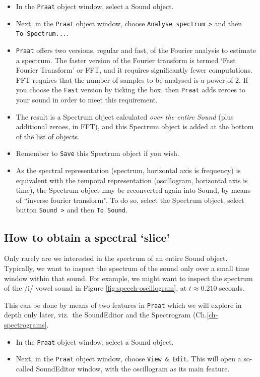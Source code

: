\documentclass[
]{book}
\begin{document}
\begin{itemize}
\item
  In the \texttt{Praat} object window, select a Sound object.
\item
  Next, in the \texttt{Praat} object window, choose \texttt{Analyse\ spectrum\ \textgreater{}} and then \texttt{To\ Spectrum...}.
\item
  \texttt{Praat} offers two versions, regular and fast, of the Fourier analysis to estimate a spectrum. The faster version of the Fourier transform is termed `Fast Fourier Transform' or FFT, and it requires significantly fewer computations. FFT requires that the number of samples to be analysed is a power of \(2\). If you choose the \texttt{Fast} version by ticking the box, then \texttt{Praat} adds zeroes to your sound in order to meet this requirement.
\item
  The result is a Spectrum object calculated \emph{over the entire Sound} (plus additional zeroes, in FFT), and this Spectrum object is added at the bottom of the list of objects.
\item
  Remember to \texttt{Save} this Spectrum object if you wish.
\item
  As the spectral representation (spectrum, horizontal axis is frequency) is equivalent with the temporal representation (oscillogram, horizontal axis is time), the Spectrum object may be reconverted again into Sound, by means of ``inverse fourier transform''.
  To do so, select the Spectrum object, select button \texttt{Sound\ \textgreater{}} and then \texttt{To\ Sound}.
\end{itemize}

\label{box-praatspectralslice}
\subsection{How to obtain a spectral `slice'}\label{sec:spectralslice}

Only rarely are we interested in the spectrum of an entire Sound object. Typically, we want to inspect the spectrum of the sound only over a small time window within that sound. For example, we might want to inspect the spectrum of the /i/ vowel sound in Figure \ref{fig:speech-oscillogram}, at \(t \approx 0.210\) seconds.

This can be done by means of two features in \texttt{Praat} which we will explore in depth only later, viz.~the SoundEditor and the Spectrogram (Ch.\ref{ch-spectrograms}.

\begin{itemize}
\item
  In the \texttt{Praat} object window, select a Sound object.
\item
  Next, in the \texttt{Praat} object window, choose \texttt{View\ \&\ Edit}. This will open a so-called SoundEditor window, with the oscillogram as its main feature.
\end{itemize}
\end{document}
